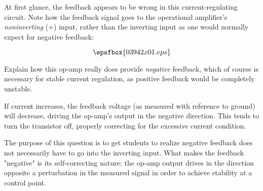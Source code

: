 

At first glance, the feedback appears to be wrong in this current-regulating circuit.  Note how the feedback signal goes to the operational amplifier's {\it noninverting} (+) input, rather than the inverting input as one would normally expect for negative feedback:

$$\epsfbox{03942x01.eps}$$

Explain how this op-amp really does provide {\it negative} feedback, which of course is necessary for stable current regulation, as positive feedback would be completely unstable.







If current increases, the feedback voltage (as measured with reference to ground) will decrease, driving the op-amp's output in the negative direction.  This tends to turn the transistor off, properly correcting for the excessive current condition.







The purpose of this question is to get students to realize negative feedback does not necessarily have to go into the inverting input.  What makes the feedback "negative" is its self-correcting nature: the op-amp output drives in the direction opposite a perturbation in the measured signal in order to achieve stability at a control point.




